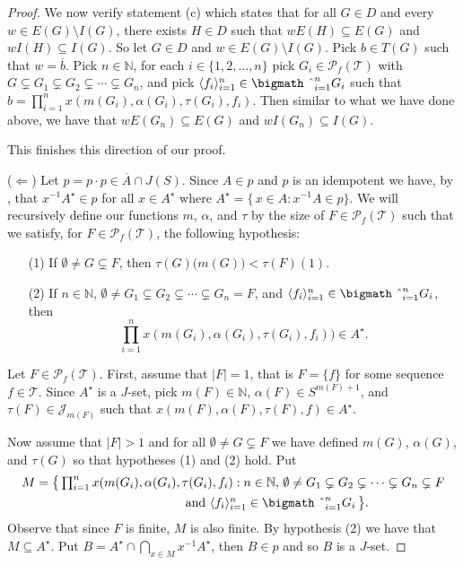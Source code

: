 \documentclass[12pt,showtrims]{memoir}
\theoremstyle{plain}
\theoremstyle{definition}
\newcommand{\la}{\langle}
\newcommand{\ra}{\rangle}
\newcommand{\bbN}{\mathbb{N}}
\newcommand{\calJ}{\mathcal{J}}
\newcommand{\calT}{\mathcal{T}}
\newcommand{\Pf}{\mathcal{P}_f}
\newcommand{\bigtimes}{\hbox{\bigmath \char'2}}
\begin{document}
\begin{proof}
  We now verify statement (c) which states that for all $G \in D$ and every $w \in E(G) \setminus I(G)$, there exists $H \in D$ such that $wE(H) \subseteq E(G)$ and $wI(H) \subseteq I(G)$.
  So let $G \in D$ and $w \in E(G) \setminus I(G)$. 
  Pick $b \in T(G)$ such that $w = \overline{b}$. 
  Pick $n \in \bbN$, for each $i \in \{1, 2, \ldots, n\}$ pick $G_i \in \Pf(\calT)$ with $G \subsetneq G_1 \subsetneq G_2 \subsetneq \cdots \subsetneq G_n$, and pick $\la f_i \ra_{i=1}^n \in \bigtimes_{i=1}^n G_i$ such that $b = \prod_{i=1}^n x(m(G_i), \alpha(G_i), \tau(G_i), f_i)$. 
  Then similar to what we have done above, we have that $wE(G_n) \subseteq E(G)$ and $wI(G_n) \subseteq I(G)$.

  This finishes this direction of our proof. 

  ($\Leftarrow$)
  Let $p = p \cdot p \in \overline{A} \cap J(S)$.
  Since $A \in p$ and $p$ is an idempotent we have, by \cite[Lemma 4.14]{Hindman:1998fk}, that $x^{-1}A^\star \in p$ for all $x \in A^\star$ where $A^\star = \{\, x \in A : x^{-1}A \in p\}$. 
  We will recursively define our functions $m$, $\alpha$, and $\tau$ by the size of $F \in \Pf(\calT)$ such that we satisfy, for $F \in \Pf(\calT)$, the following hypothesis:
  \begin{itemize}
    \item[(1)] If $\emptyset \ne G \subsetneq F$, then $\tau(G)\bigl( m(G) \bigr) < \tau(F)(1)$.
    
    \item[(2)] If $n \in \bbN$, $\emptyset \ne G_1 \subsetneq G_2 \subsetneq \cdots \subsetneq G_n = F$, and $\la f_i \ra_{i=1}^n \in \bigtimes_{i=1}^n G_i$, then \[\textstyle \prod_{i=1}^n x(m(G_i), \alpha(G_i), \tau(G_i), f_i)) \in A^\star.\]
  \end{itemize}

  Let $F \in \Pf(\calT)$.
  First, assume that $|F| = 1$, that is $F = \{f\}$ for some sequence $f \in \calT$.
  Since $A^\star$ is a $J$-set, pick $m(F) \in \bbN$, $\alpha(F) \in S^{m(F)+1}$, and $\tau(F) \in \calJ_{m(F)}$ such that $x(m(F), \alpha(F), \tau(F), f) \in A^\star$. 

  Now assume that $|F| > 1$ and for all $\emptyset \ne G \subsetneq F$ we have defined $m(G)$, $\alpha(G)$, and $\tau(G)$ so that hypotheses (1) and (2) hold.
  Put 
  \begin{align*}
    M &= \bigl\{\, \textstyle \prod_{i=1}^n x(m(G_i), \alpha(G_i), \tau(G_i), f_i) : \mbox{$n \in \bbN$, $\emptyset \ne G_1 \subsetneq G_2 \subsetneq \cdots \subsetneq G_n \subsetneq F$} \\
    &\hspace{12em} \mbox{and $\la f_i \ra_{i=1}^n \in \bigtimes_{i=1}^n G_i$} \,\bigr\}.
  \end{align*}
  Observe that since $F$ is finite, $M$ is also finite.
  By hypothesis (2) we have that $M \subseteq A^\star$.
  Put $B = A^\star \cap \bigcap_{x \in M} x^{-1}A^\star$, then $B \in p$ and so $B$ is a $J$-set. 


\end{proof}
\end{document}
